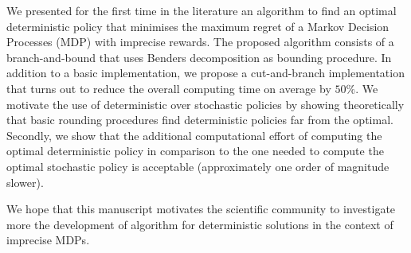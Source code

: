 We presented for the first time in the literature an algorithm to find an optimal deterministic policy that minimises the maximum regret of a Markov Decision Processes (MDP) with imprecise rewards.
The proposed algorithm consists of a branch-and-bound that uses Benders decomposition as bounding procedure. In addition to a basic implementation, we propose a cut-and-branch implementation that turns out to reduce the overall computing time on average by $50\%$.  
We motivate the use of deterministic over stochastic policies by showing theoretically that basic rounding procedures find deterministic policies far from the optimal. Secondly, we show that the additional computational effort of computing the optimal deterministic policy in comparison to the one needed to compute the optimal stochastic policy is acceptable (approximately one order of magnitude slower). 

 We hope that this manuscript motivates the scientific community to investigate more the development of algorithm for deterministic solutions in the context of imprecise MDPs.

